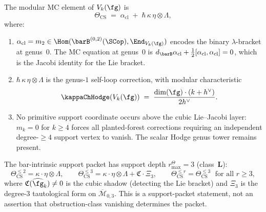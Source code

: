 \begin{theorem}
\label{thm:cs-mc-element}
The modular MC element of $V_k(\fg)$ is
\begin{equation}\label{eq:cs-mc-element}
\Theta_{\mathrm{CS}}
\;=\;
\alpha_{\mathrm{cl}}
\;+\;
\hbar\,\kappa\,\eta \otimes \Lambda,
\end{equation}
where:
\begin{enumerate}[label=\textup{(\roman*)}]
\item $\alpha_{\mathrm{cl}} = m_2 \in
 \Hom(\barB^{(0,2)}(\SCop), \End_{V_k(\fg)})$
 encodes the binary $\lambda$-bracket at genus~$0$.
 The MC equation at genus~$0$ is
 $d_{\barB}\alpha_{\mathrm{cl}}
 + \frac{1}{2}[\alpha_{\mathrm{cl}}, \alpha_{\mathrm{cl}}] = 0$,
 which is the Jacobi identity for the Lie bracket.
\item $\hbar\,\kappa\,\eta \otimes \Lambda$ is the genus-$1$
 self-loop correction, with modular characteristic
 \begin{equation}\label{eq:cs-kappa}
 \kappaChHodge(V_k(\fg))
 \;=\;
 \frac{\dim(\fg)\cdot(k + h^\vee)}{2h^\vee}.
 \end{equation}
\item No primitive support coordinate occurs above the cubic
 Lie--Jacobi layer: $m_k = 0$ for $k \ge 4$
 forces all planted-forest corrections requiring an independent
 degree-$\ge4$ support vertex to vanish.  The scalar Hodge genus tower
 remains present.
\end{enumerate}
The bar-intrinsic support packet has support depth
\(r^\Theta_{\max}=3\) (class~$\mathbf{L}$):
\[
\Theta_{\mathrm{CS}}^{\le 2} = \kappa \cdot \eta \otimes \Lambda,
\qquad
\Theta_{\mathrm{CS}}^{\le 3} = \kappa \cdot \eta \otimes \Lambda
+ \mathfrak{C} \cdot \Xi_3,
\qquad
\Theta_{\mathrm{CS}}^{\le r} = \Theta_{\mathrm{CS}}^{\le 3}
\;\text{ for all } r \ge 3,
\]
where $\mathfrak{C}(\widehat{\fg}_k) \ne 0$ is the cubic shadow
(detecting the Lie bracket) and $\Xi_3$ is the degree-$3$
tautological form on $\overline{\mathcal{M}}_{0,3}$. This is a
support-packet statement, not an assertion that obstruction-class
vanishing determines the packet.
\end{theorem}

